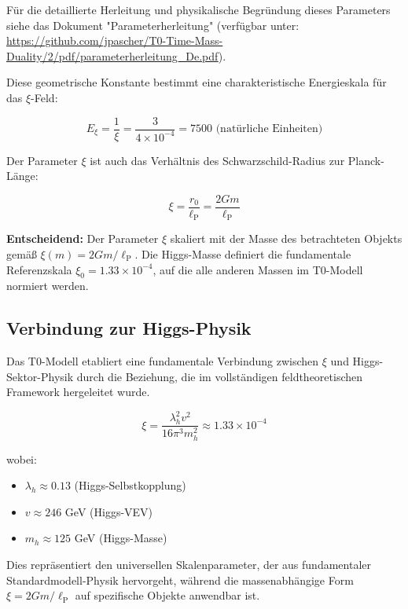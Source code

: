 \documentclass[12pt,a4paper]{article}
\newcommand{\xipar}{\xi}
\newcommand{\lP}{\ell_{\text{P}}}
\newcommand{\lambdah}{\lambda_h}
\newcommand{\pichar}{\pi}
\begin{document}
		Für die detaillierte Herleitung und physikalische Begründung dieses Parameters siehe das Dokument "Parameterherleitung" (verfügbar unter:\\ \url{https://github.com/jpascher/T0-Time-Mass-Duality/2/pdf/parameterherleitung_De.pdf}).

	
	Diese geometrische Konstante bestimmt eine charakteristische Energieskala für das $\xi$-Feld:
	
	\begin{equation}
		E_\xi = \frac{1}{\xi} = \frac{3}{4 \times 10^{-4}} = 7500 \text{ (natürliche Einheiten)}
	\end{equation}
	
	Der Parameter $\xipar$ ist auch das Verhältnis des Schwarzschild-Radius zur Planck-Länge:
	
	\begin{equation}
		\xipar = \frac{r_0}{\lP} = \frac{2Gm}{\lP}
		\label{eq:xi_definition}
	\end{equation}
	
\textbf{Entscheidend:} Der Parameter $\xipar$ skaliert mit der Masse des betrachteten Objekts gemäß $\xipar(m) = 2Gm/\lP$. Die Higgs-Masse definiert die fundamentale Referenzskala $\xipar_0 = 1.33 \times 10^{-4}$, auf die alle anderen Massen im T0-Modell normiert werden.
	
	\subsection{Verbindung zur Higgs-Physik}
	\label{subsec:xi_higgs_verbindung}
	
	Das T0-Modell etabliert eine fundamentale Verbindung zwischen $\xipar$ und Higgs-Sektor-Physik durch die Beziehung, die im vollständigen feldtheoretischen Framework hergeleitet wurde.
	
	\begin{equation}
		\xipar = \frac{\lambdah^2 v^2}{16\pichar^3 m_h^2} \approx 1.33 \times 10^{-4}
		\label{eq:xi_higgs_fundamental}
	\end{equation}
	
	wobei:
	\begin{itemize}
		\item $\lambdah \approx 0.13$ (Higgs-Selbstkopplung)
		\item $v \approx 246$ GeV (Higgs-VEV)
		\item $m_h \approx 125$ GeV (Higgs-Masse)
	\end{itemize}
	
	Dies repräsentiert den universellen Skalenparameter, der aus fundamentaler Standardmodell-Physik hervorgeht, während die massenabhängige Form $\xipar = 2Gm/\lP$ auf spezifische Objekte anwendbar ist.
	
\end{document}

